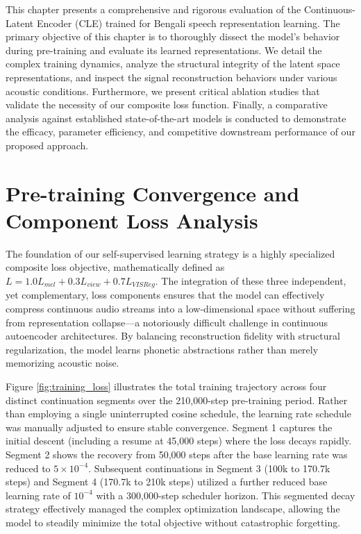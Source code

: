 This chapter presents a comprehensive and rigorous evaluation of the Continuous-Latent Encoder (CLE) trained for Bengali speech representation learning. The primary objective of this chapter is to thoroughly dissect the model's behavior during pre-training and evaluate its learned representations. We detail the complex training dynamics, analyze the structural integrity of the latent space representations, and inspect the signal reconstruction behaviors under various acoustic conditions. Furthermore, we present critical ablation studies that validate the necessity of our composite loss function. Finally, a comparative analysis against established state-of-the-art models is conducted to demonstrate the efficacy, parameter efficiency, and competitive downstream performance of our proposed approach.

\section{Pre-training Convergence and Component Loss Analysis}

The foundation of our self-supervised learning strategy is a highly specialized composite loss objective, mathematically defined as $L = 1.0 L_{mel} + 0.3 L_{view} + 0.7 L_{VISReg}$. The integration of these three independent, yet complementary, loss components ensures that the model can effectively compress continuous audio streams into a low-dimensional space without suffering from representation collapse—a notoriously difficult challenge in continuous autoencoder architectures. By balancing reconstruction fidelity with structural regularization, the model learns phonetic abstractions rather than merely memorizing acoustic noise.

Figure \ref{fig:training_loss} illustrates the total training trajectory across four distinct continuation segments over the 210,000-step pre-training period. Rather than employing a single uninterrupted cosine schedule, the learning rate schedule was manually adjusted to ensure stable convergence. Segment 1 captures the initial descent (including a resume at 45,000 steps) where the loss decays rapidly. Segment 2 shows the recovery from 50,000 steps after the base learning rate was reduced to $5 \times 10^{-4}$. Subsequent continuations in Segment 3 (100k to 170.7k steps) and Segment 4 (170.7k to 210k steps) utilized a further reduced base learning rate of $10^{-4}$ with a 300,000-step scheduler horizon. This segmented decay strategy effectively managed the complex optimization landscape, allowing the model to steadily minimize the total objective without catastrophic forgetting.

